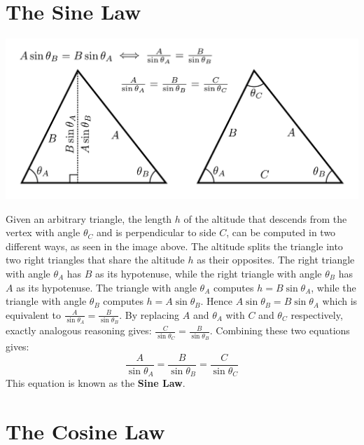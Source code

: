\documentclass{article}
\begin{document}
\section*{The Sine Law}  

\includegraphics[width = \textwidth]{sine_law_for_triangles}

Given an arbitrary triangle, the length \(h\) of the altitude that descends from the vertex with angle \(\theta_C\) and is perpendicular to side \(C\), can be computed in two different ways, as seen in the image above. The altitude splits the triangle into two right triangles that share the altitude \(h\) as their opposites. The right triangle with angle \(\theta_A\) has \(B\) as its hypotenuse, while the right triangle with angle \(\theta_B\) has \(A\) as its hypotenuse. The triangle with angle \(\theta_A\) computes \(h = B\sin\theta_A\), while the triangle with angle \(\theta_B\) computes \(h = A\sin\theta_B\). Hence \(A\sin\theta_B = B\sin\theta_A\) which is equivalent to \(\frac{A}{\sin\theta_A} = \frac{B}{\sin\theta_B}\). By replacing \(A\) and \(\theta_A\) with \(C\) and \(\theta_C\) respectively, exactly analogous reasoning gives: \(\frac{C}{\sin\theta_C} = \frac{B}{\sin\theta_B}\). Combining these two equations gives:
\[\frac{A}{\sin\theta_A} = \frac{B}{\sin\theta_B} = \frac{C}{\sin\theta_C}\]
This equation is known as the {\bf Sine Law}.



\section*{The Cosine Law}
\end{document}
